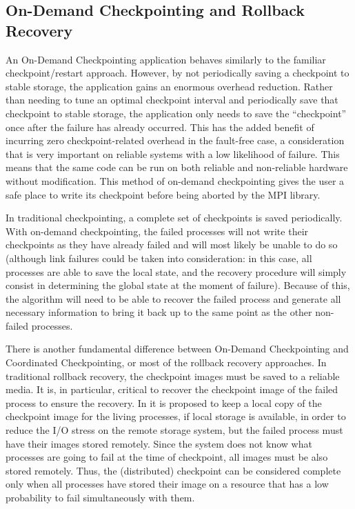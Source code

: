 \subsection{On-Demand Checkpointing and Rollback Recovery}

An On-Demand Checkpointing application behaves similarly to the
familiar checkpoint/restart approach. However, by not periodically
saving a checkpoint to stable storage, the application gains an
enormous overhead reduction. Rather than needing to tune an optimal
checkpoint interval and periodically save that checkpoint to stable
storage, the application only needs to save the ``checkpoint'' once
after the failure has already occurred. This has the added benefit of
incurring zero checkpoint-related overhead in the fault-free case, a
consideration that is very important on reliable systems with a low
likelihood of failure.  This means that the same code can be run on
both reliable and non-reliable hardware without modification. This
method of on-demand checkpointing gives the user a safe place to write
its checkpoint before being aborted by the MPI library.

In traditional checkpointing, a complete set of checkpoints is saved
periodically. With on-demand checkpointing, the failed processes will
not write their checkpoints as they have already failed and will most
likely be unable to do so (although link failures could be taken into
consideration: in this case, all processes are able to save the local
state, and the recovery procedure will simply consist in determining
the global state at the moment of failure). Because of this, the
algorithm will need to be able to recover the failed process and
generate all necessary information to bring it back up to the same
point as the other non-failed processes.

There is another fundamental difference between On-Demand
Checkpointing and Coordinated Checkpointing, or most of the rollback
recovery approaches. In traditional rollback recovery, the checkpoint
images must be saved to a reliable media. It is, in particular,
critical to recover the checkpoint image of the failed process to
ensure the recovery. In \cite{HierarchicalCheckpoint09} it is proposed
to keep a local copy of the checkpoint image for the living processes,
if local storage is available, in order to reduce the I/O stress on
the remote storage system, but the failed process must have their
images stored remotely. Since the system does not know what processes
are going to fail at the time of checkpoint, all images must be also
stored remotely. Thus, the (distributed) checkpoint can be considered
complete only when all processes have stored their image on a resource
that has a low probability to fail simultaneously with them. 

